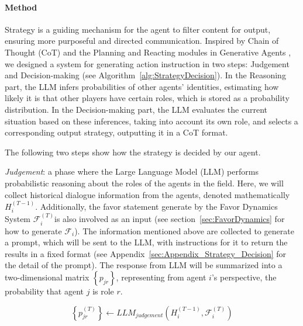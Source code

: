 \paragraph{Method} Strategy is a guiding mechanism for the agent to filter content for output, ensuring more purposeful and directed communication. Inspired by Chain of Thought (CoT) \citep{wei2022chain} and the Planning and Reacting modules in Generative Agents \citep{park2023generative}, we designed a system for generating action instruction in two steps: Judgement and Decision-making (see Algorithm~\ref{alg:StrategyDecision}). In the Reasoning part, the LLM infers probabilities of other agents' identities, estimating how likely it is that other players have certain roles, which is stored as a probability distribution. In the Decision-making part, the LLM evaluates the current situation based on these inferences, taking into account its own role, and selects a corresponding output strategy, outputting it in a CoT format.

The following two steps show how the strategy is decided by our agent.

\textit{Judgement}: \label{sec:strategy_judgement} a phase where the Large Language Model (LLM) performs probabilistic reasoning about the roles of the agents in the field. Here, we will collect historical dialogue information from the agents, denoted mathematically $ H_i^{(T-1)} $. Additionally, the favor statement generate by the Favor Dynamics System $ \mathcal{F}_i^{(T)} $is also involved as an input (see section~\ref{sec:FavorDynamics} for how to generate $ \mathcal{F}_i $). The information mentioned above are collected to generate a prompt, which will be sent to the LLM, with instructions for it to return the results in a fixed format (see Appendix~\ref{sec:Appendix_Strategy_Decision} for the detail of the prompt). The response from LLM will be summarized into a two-dimensional matrix $ \left\{ p_{jr} \right\} $, representing from agent $ i $'s perspective, the probability that agent $ j $ is role $ r $.

\begin{equation}
  \left\{ p_{jr}^{(T)} \right\}\leftarrow LLM_{judgement}(H_i^{(T-1)},\mathcal{F}_i^{(T)}) 
  \label{eq:strategy_LLM_Judge}
\end{equation}

